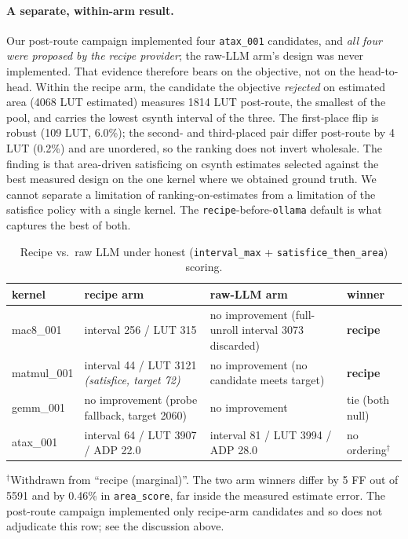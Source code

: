 \paragraph{A separate, within-arm result.} Our post-route campaign implemented four
\texttt{atax\_001} candidates, and \emph{all four were proposed by the recipe
provider}; the raw-LLM arm's design was never implemented. That evidence therefore
bears on the objective, not on the head-to-head. Within the recipe arm, the candidate
the objective \emph{rejected} on estimated area (4068 LUT estimated) measures 1814
LUT post-route, the smallest of the pool, and carries the lowest csynth interval of
the three. The first-place flip is robust (109 LUT, 6.0\%); the second- and
third-placed pair differ post-route by 4 LUT (0.2\%) and are unordered, so the
ranking does not invert wholesale. The finding is that area-driven satisficing on
csynth estimates selected against the best measured design on the one kernel where we
obtained ground truth. We cannot separate a limitation of ranking-on-estimates from a
limitation of the satisfice policy with a single kernel.
The \texttt{recipe}-before-\texttt{ollama} default is what captures the best of both.

\begin{table}[t]
\centering\small
\caption{Recipe vs.\ raw LLM under honest (\texttt{interval\_max} + \texttt{satisfice\_then\_area}) scoring.}
\label{tab:recipe-vs-llm}
\begin{tabular}{llll}
\toprule
kernel & recipe arm & raw-LLM arm & winner \\
\midrule
mac8\_001   & interval 256 / LUT 315                          & no improvement (full-unroll interval 3073 discarded) & \textbf{recipe} \\
matmul\_001 & interval 44 / LUT 3121 \emph{(satisfice, target 72)} & no improvement (no candidate meets target)          & \textbf{recipe} \\
gemm\_001   & no improvement (probe fallback, target 2060)    & no improvement                                       & tie (both null) \\
atax\_001   & interval 64 / LUT 3907 / ADP 22.0               & interval 81 / LUT 3994 / ADP 28.0                    & no ordering$^{\dagger}$ \\
\bottomrule
\end{tabular}

\smallskip
\raggedright\footnotesize $^{\dagger}$Withdrawn from ``recipe (marginal)''. The
two arm winners differ by 5 FF out of 5591 and by 0.46\% in \texttt{area\_score},
far inside the measured estimate error. The post-route campaign implemented only
recipe-arm candidates and so does not adjudicate this row; see the discussion above.
\end{table}

